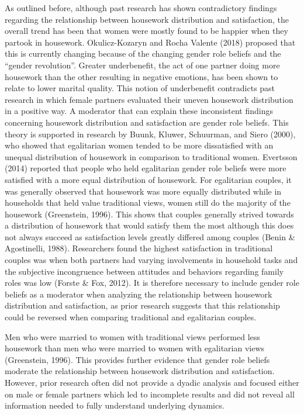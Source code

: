 \documentclass[
  english,
  man]{apa6}
\begin{document}
As outlined before, although past research has shown contradictory findings regarding the relationship between housework distribution and satisfaction, the overall trend has been that women were mostly found to be happier when they partook in housework. Okulicz-Kozaryn and Rocha Valente (2018) proposed that this is currently changing because of the changing gender role beliefs and the \enquote{gender revolution}. Greater underbenefit, the act of one partner doing more housework than the other resulting in negative emotions, has been shown to relate to lower marital quality. This notion of underbenefit contradicts past research in which female partners evaluated their uneven housework distribution in a positive way. A moderator that can explain these inconsistent findings concerning housework distribution and satisfaction are gender role beliefs. This theory is supported in research by Buunk, Kluwer, Schuurman, and Siero (2000), who showed that egalitarian women tended to be more dissatisfied with an unequal distribution of housework in comparison to traditional women. Evertsson (2014) reported that people who held egalitarian gender role beliefs were more satisfied with a more equal distribution of housework. For egalitarian couples, it was generally observed that housework was more equally distributed while in households that held value traditional views, women still do the majority of the housework (Greenstein, 1996). This shows that couples generally strived towards a distribution of housework that would satisfy them the most although this does not always succeed as satisfaction levels greatly differed among couples (Benin \& Agostinelli, 1988). Researchers found the highest satisfaction in traditional couples was when both partners had varying involvements in household tasks and the subjective incongruence between attitudes and behaviors regarding family roles was low (Forste \& Fox, 2012). It is therefore necessary to include gender role beliefs as a moderator when analyzing the relationship between housework distribution and satisfaction, as prior research suggests that this relationship could be reversed when comparing traditional and egalitarian couples.

Men who were married to women with traditional views performed less housework than men who were married to women with egalitarian views (Greenstein, 1996). This provides further evidence that gender role beliefs moderate the relationship between housework distribution and satisfaction. However, prior research often did not provide a dyadic analysis and focused either on male or female partners which led to incomplete results and did not reveal all information needed to fully understand underlying dynamics.
\end{document}
